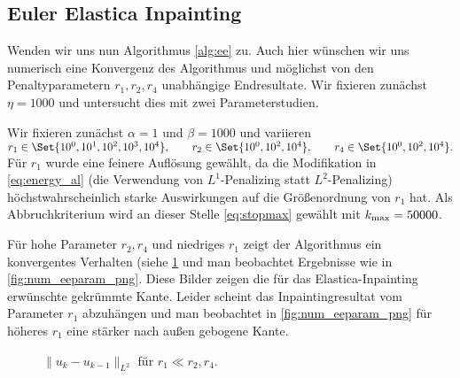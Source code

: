 \documentclass{mythesis}
\begin{document}
\subsection*{Euler Elastica Inpainting}

Wenden wir uns nun Algorithmus \ref{alg:ee} zu.
Auch hier wünschen wir uns numerisch eine Konvergenz des Algorithmus und möglichst von den Penaltyparametern $r_1, r_2, r_4$ unabhängige Endresultate.
Wir fixieren zunächst $\eta = 1000$ und untersucht dies mit zwei Parameterstudien.

Wir fixieren zunächst $\alpha = 1$ und $\beta = 1000$ und variieren
\begin{math}[numbered] \label{eq:num_param}
    r_1 \in \Set{10^0, 10^1, 10^2, 10^3, 10^4}, \qquad
    r_2 \in \Set{10^0, 10^2, 10^4}, \qquad
    r_4 \in \Set{10^0, 10^2, 10^4}.
\end{math}
Für $r_1$ wurde eine feinere Auflösung gewählt, da die Modifikation in \eqref{eq:energy_al} (die Verwendung von $L^1$-Penalizing statt $L^2$-Penalizing) höchstwahrscheinlich starke Auswirkungen auf die Größenordnung von $r_1$ hat.
Als Abbruchkriterium wird an dieser Stelle \eqref{eq:stopmax} gewählt mit $k_{\mathrm{max}} = 50000$.


Für hohe Parameter $r_2, r_4$ und niedriges $r_1$ zeigt der Algorithmus ein konvergentes Verhalten (siehe \ref{fig:num_eeparam_conv} und man beobachtet Ergebnisse wie in \ref{fig:num_eeparam_png}.
Diese Bilder zeigen die für das Elastica-Inpainting erwünschte gekrümmte Kante.
Leider scheint das Inpaintingresultat vom Parameter $r_1$ abzuhängen und man beobachtet in \ref{fig:num_eeparam_png} für höheres $r_1$ eine stärker nach außen gebogene Kante.



\begin{figure}[ht]
    \centering
    \caption{$\|u_k - u_{k-1}\|_{L^2}$ für $r_1 \ll r_2, r_4$.}
    \label{fig:num_eeparam_conv}
\end{figure}
\end{document}
